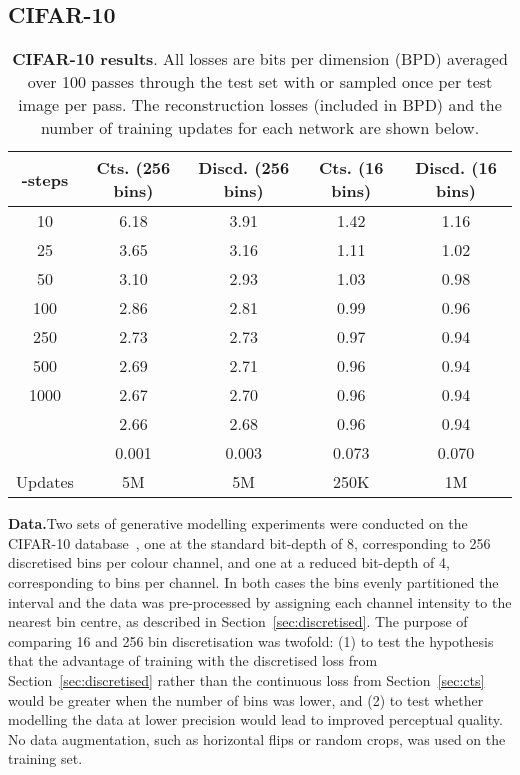 \documentclass[11pt,table]{article}
\newcommand{\0}[1]{\constvec{0}{#1}}
\newcommand{\1}[1]{\constvec{1}{#1}}
\begin{document}
\subsection{CIFAR-10}
\begin{table}[t!]
\centering
\begin{tabular}{ccccc}
\toprule
-steps & Cts. (256 bins) & Discd. (256 bins) & Cts. (16 bins) & Discd. (16 bins)\\ 
\midrule
10  & 6.18 & 3.91 & 1.42 & 1.16\\ 
25  & 3.65 & 3.16 & 1.11 & 1.02\\ 
50  & 3.10 & 2.93 & 1.03 & 0.98\\ 
100 & 2.86 & 2.81 & 0.99 & 0.96 \\ 
250 & 2.73 & 2.73 & 0.97 & 0.94\\ 
500 & 2.69 & 2.71 & 0.96 & 0.94\\ 
1000& 2.67 & 2.70 & 0.96 & 0.94\\ 
\midrule
 &  2.66 & 2.68 & 0.96 & 0.94\\ 
\bottomrule
\toprule
 &  0.001 & 0.003 & 0.073 & 0.070\\ 
\midrule
Updates & 5M & 5M & 250K & 1M \\ 
\bottomrule
\end{tabular}
\caption{\textbf{CIFAR-10 results}. All losses are bits per dimension (BPD) averaged over 100 passes through the test set with  or  sampled once per test image per pass. The reconstruction losses  (included in BPD) and the number of training updates for each network are shown below.}
\label{tab:cifar_results}
\end{table}

\textbf{Data.}\quad Two sets of generative modelling experiments were conducted on the CIFAR-10 database~\citep{Krizhevsky09learningmultiple}, one at the standard bit-depth of 8, corresponding to 256 discretised bins per colour channel, and one at a reduced bit-depth of 4, corresponding to  bins per channel.
In both cases the bins evenly partitioned the interval  and the data was pre-processed by assigning each channel intensity to the nearest bin centre, as described in Section~\ref{sec:discretised}.
The purpose of comparing 16 and 256 bin discretisation was twofold: (1) to test the hypothesis that the advantage of training with the discretised loss from Section~\ref{sec:discretised} rather than the continuous loss from Section~\ref{sec:cts} would be greater when the number of bins was lower, and (2) to test whether modelling the data at lower precision would lead to improved perceptual quality.
No data augmentation, such as horizontal flips or random crops, was used on the training set.
\\
\end{document}
